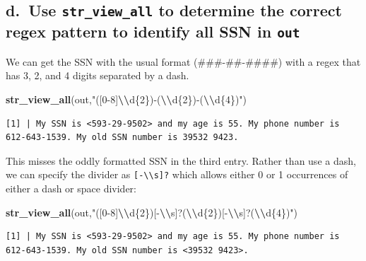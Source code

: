 \documentclass[
]{book}
\newenvironment{Shaded}{\begin{snugshade}}{\end{snugshade}}
\newcommand{\FunctionTok}[1]{\textcolor[rgb]{0.13,0.29,0.53}{\textbf{#1}}}
\newcommand{\NormalTok}[1]{#1}
\newcommand{\SpecialCharTok}[1]{\textcolor[rgb]{0.81,0.36,0.00}{\textbf{#1}}}
\newcommand{\StringTok}[1]{\textcolor[rgb]{0.31,0.60,0.02}{#1}}
\begin{document}
\hypertarget{d.-use-str_view_all-to-determine-the-correct-regex-pattern-to-identify-all-ssn-in-out}{%
\subsection{\texorpdfstring{d.~Use \texttt{str\_view\_all} to determine the correct regex pattern to identify all SSN in \texttt{out}}{d.~Use str\_view\_all to determine the correct regex pattern to identify all SSN in out}}\label{d.-use-str_view_all-to-determine-the-correct-regex-pattern-to-identify-all-ssn-in-out}}

We can get the SSN with the usual format (\#\#\#-\#\#-\#\#\#\#) with a regex that has 3, 2, and 4 digits separated by a dash.

\begin{Shaded}
\begin{Highlighting}[]
\FunctionTok{str\_view\_all}\NormalTok{(out,}\StringTok{"([0{-}8]}\SpecialCharTok{\textbackslash{}\textbackslash{}}\StringTok{d\{2\}){-}(}\SpecialCharTok{\textbackslash{}\textbackslash{}}\StringTok{d\{2\}){-}(}\SpecialCharTok{\textbackslash{}\textbackslash{}}\StringTok{d\{4\})"}\NormalTok{)}
\end{Highlighting}
\end{Shaded}

\begin{verbatim}
[1] | My SSN is <593-29-9502> and my age is 55. My phone number is 612-643-1539. My old SSN number is 39532 9423.
\end{verbatim}

This misses the oddly formatted SSN in the third entry. Rather than use a dash, we can specify the divider as \texttt{{[}-\textbackslash{}\textbackslash{}s{]}?} which allows either 0 or 1 occurrences of either a dash or space divider:

\begin{Shaded}
\begin{Highlighting}[]
\FunctionTok{str\_view\_all}\NormalTok{(out,}\StringTok{"([0{-}8]}\SpecialCharTok{\textbackslash{}\textbackslash{}}\StringTok{d\{2\})[{-}}\SpecialCharTok{\textbackslash{}\textbackslash{}}\StringTok{s]?(}\SpecialCharTok{\textbackslash{}\textbackslash{}}\StringTok{d\{2\})[{-}}\SpecialCharTok{\textbackslash{}\textbackslash{}}\StringTok{s]?(}\SpecialCharTok{\textbackslash{}\textbackslash{}}\StringTok{d\{4\})"}\NormalTok{)}
\end{Highlighting}
\end{Shaded}

\begin{verbatim}
[1] | My SSN is <593-29-9502> and my age is 55. My phone number is 612-643-1539. My old SSN number is <39532 9423>.
\end{verbatim}
\end{document}

